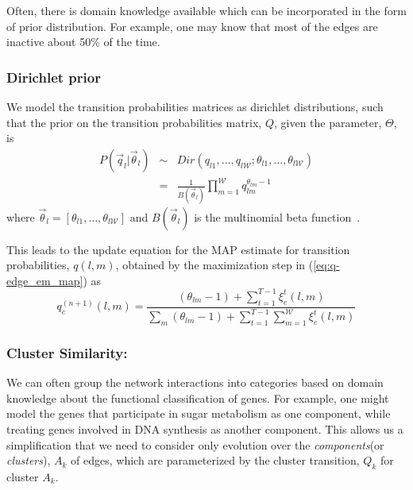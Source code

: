 \documentclass{bioinfo}
\begin{document}
\begin{methods}
Often, there is domain knowledge available which can be incorporated
in the form of prior distribution. For example, one may know that most
of the edges are inactive about 50\% of the time.


\subsubsection{Dirichlet prior}
We model the transition probabilities matrices as dirichlet distributions,
such that  the prior on the transition probabilities matrix, $Q$, 
given the parameter, $\Theta$, is
\begin{eqnarray}
  \label{eq:q_prior}
  P(\vec{q}_{l} | \vec{\theta}_{l}) &\sim& Dir(q_{l1}, \ldots, q_{l\mathcal{W}} ;
  \theta_{l1},\ldots, \theta_{l\mathcal{W}}) \\
&=& \frac{1}{B(\vec{\theta}_{l})} \prod_{m=1}^{\mathcal{W}} q_{lm}^{\theta_{lm}-1}
\end{eqnarray}
where $\vec{\theta}_{l}=[\theta_{l1},\ldots,\theta_{l\mathcal{W}}]$ and
$B(\vec{\theta}_{l})$ is the multinomial beta
function~\cite{Gelman03bayesian}.

This leads to the update equation for the MAP estimate for transition
probabilities, $q(l,m)$, obtained by the maximization step in (\ref{eq:q-edge_em_map}) as
\begin{equation}
  \label{eq:q-update}
  q^{(n+1)}_{e}(l, m) = \frac{(\theta_{lm}-1) + \sum_{t=1}^{T-1} \xi^{t}_{e}(l,
    m) }{\sum_{m} (\theta_{lm} -1) + \sum^{T-1}_{t=1} \sum^{\mathcal
      W}_{m=1} \xi^{t}_{e}(l,m)}
\end{equation}
\subsubsection{Cluster Similarity: } 
We can often group the network interactions into categories  based on
domain knowledge about the functional classification of genes.  For
example, one might model the genes that participate in sugar
metabolism as one 
component, while treating genes involved in DNA synthesis as another
component.  This allows us a
simplification that we need to  consider only evolution over the
\emph{components}(or \emph{clusters}), $A_k$ of edges,  which are parameterized by the
cluster transition, $Q_{k}$ for  cluster $A_k$. 


\end{methods}
\end{document}
